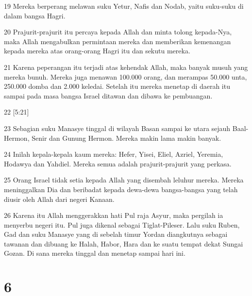 \par 19 Mereka berperang melawan suku Yetur, Nafis dan Nodab, yaitu suku-suku di dalam bangsa Hagri.
\par 20 Prajurit-prajurit itu percaya kepada Allah dan minta tolong kepada-Nya, maka Allah mengabulkan permintaan mereka dan memberikan kemenangan kepada mereka atas orang-orang Hagri itu dan sekutu mereka.
\par 21 Karena peperangan itu terjadi atas kehendak Allah, maka banyak musuh yang mereka bunuh. Mereka juga menawan 100.000 orang, dan merampas 50.000 unta, 250.000 domba dan 2.000 keledai. Setelah itu mereka menetap di daerah itu sampai pada masa bangsa Israel ditawan dan dibawa ke pembuangan.
\par 22 [5:21]
\par 23 Sebagian suku Manasye tinggal di wilayah Basan sampai ke utara sejauh Baal-Hermon, Senir dan Gunung Hermon. Mereka makin lama makin banyak.
\par 24 Inilah kepala-kepala kaum mereka: Hefer, Yisei, Eliel, Azriel, Yeremia, Hodawya dan Yahdiel. Mereka semua adalah prajurit-prajurit yang perkasa.
\par 25 Orang Israel tidak setia kepada Allah yang disembah leluhur mereka. Mereka meninggalkan Dia dan beribadat kepada dewa-dewa bangsa-bangsa yang telah diusir oleh Allah dari negeri Kanaan.
\par 26 Karena itu Allah menggerakkan hati Pul raja Asyur, maka pergilah ia menyerbu negeri itu. Pul juga dikenal sebagai Tiglat-Pileser. Lalu suku Ruben, Gad dan suku Manasye yang di sebelah timur Yordan diangkutnya sebagai tawanan dan dibuang ke Halah, Habor, Hara dan ke suatu tempat dekat Sungai Gozan. Di sana mereka tinggal dan menetap sampai hari ini.

\chapter{6}

